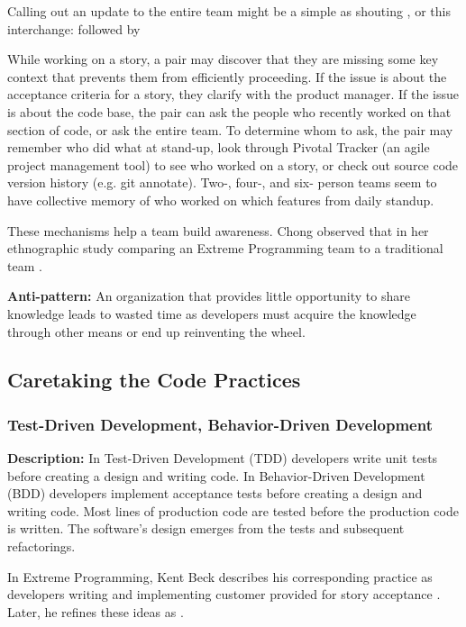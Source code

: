 Calling out an update to the entire team might be a simple as shouting , or this interchange:  followed by 

While working on a story, a pair may discover that they are missing some key context that prevents them from efficiently proceeding. If the issue is about the acceptance criteria for a story, they clarify with the product manager. If the issue is about the code base, the pair can ask the people who recently worked on that section of code, or ask the entire team. To determine whom to ask, the pair may remember who did what at stand-up, look through Pivotal Tracker (an agile project management tool) to see who worked on a story, or check out source code version history (e.g. git annotate). Two-, four-, and six- person teams seem to have collective memory of who worked on which features from daily standup. 

These mechanisms help a team build awareness. Chong observed that  in her ethnographic study comparing an Extreme Programming team to a traditional team \cite{ChongNominum}.
 
\textbf{Anti-pattern:} An organization that provides little opportunity to share knowledge leads to wasted time as developers must acquire the knowledge through other means or end up reinventing the wheel.
\subsection{Caretaking the Code Practices}
\subsubsection{Test-Driven Development, Behavior-Driven Development}
\textbf{Description:} In Test-Driven Development (TDD) developers write unit tests before creating a design and writing code. In Behavior-Driven Development (BDD) developers implement acceptance tests before creating a design and writing code. Most lines of production code are tested before the production code is written. The software's design emerges from the tests and subsequent refactorings.

In Extreme Programming, Kent Beck describes his corresponding  practice as developers writing  and implementing customer provided  for story acceptance \cite{BeckExtremeProgramming2000}. Later, he refines these ideas as  \cite{BeckExtremeProgramming2004}. 

